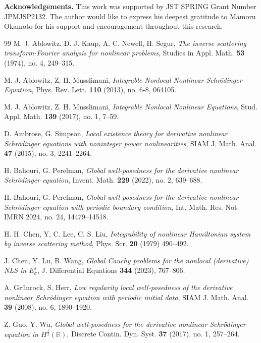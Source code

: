 \documentclass[%
11pt,  reqno]{amsart}
\newcommand{\R}{\mathbb{R}}
\newcommand{\s}{\sigma}
\numberwithin{equation}{section}
\numberwithin{theorem}{section}
\begin{document}
\noindent
{\bf 
Acknowledgements.}
This work was
supported by JST SPRING Grant Number JPMJSP2132.
The author would like to express his deepest gratitude to Mamoru Okamoto for his support and encouragement throughout this research.

\begin{thebibliography}{99}
M. J. Ablowitz, D. J. Kaup, A. C. Newell, H. Segur,
{\it The inverse scattering transform-Fourier analysis for nonlinear problems},
Studies in Appl. Math. \textbf{53} (1974), no. 4, 249–315.

M. J. Ablowitz, Z. H. Musslimani,
{\it Integrable Nonlocal Nonlinear Schr\"odinger Equation},
Phys. Rev. Lett. \textbf{110} (2013), no. 6-8, 064105.

M. J. Ablowitz, Z. H. Musslimani, 
{\it Integrable Nonlocal Nonlinear Equations},
Stud. Appl. Math. \textbf{139} (2017), no. 1, 7–59.

D. Ambrose, G. Simpson,
{\it Local existence theory for derivative nonlinear Schr\"odinger equations with noninteger power nonlinearities},
SIAM J. Math. Anal. \textbf{47} (2015), no. 3, 2241–2264.

H. Bahouri, G. Perelman,
{\it Global well-posedness for the derivative nonlinear Schr\"odinger equation},
Invent. Math. \textbf{229} (2022), no. 2, 639–688.

H. Bahouri, G. Perelman,
{\it Global well-posedness for the derivative nonlinear Schr\"odinger equation with periodic boundary condition},
Int. Math. Res. Not. IMRN 2024, no. 24, 14479–14518.

H. H. Chen, Y. C. Lee, C. S. Liu, 
{\it Integrability of nonlinear Hamiltonian system by inverse scattering method},
Phys. Scr. \textbf{20} (1979) 490--492.

J. Chen, Y. Lu, B. Wang,
{\it Global Cauchy problems for the nonlocal (derivative) NLS in $E^s_\s$},
J. Differential Equations \textbf{344} (2023), 767–806.

A. Gr\"unrock, S. Herr,
{\it Low regularity local well-posedness of the derivative nonlinear Schr\"odinger equation with periodic initial data},
SIAM J. Math. Anal. \textbf{39} (2008), no. 6, 1890–1920.

Z. Guo, Y. Wu,
{\it Global well-posedness for the derivative nonlinear Schr\"odinger equation in $H^{\frac12}(\R)$}, 
Discrete Contin. Dyn. Syst. \textbf{37} (2017), no. 1, 257–264.


\end{thebibliography}
\end{document}
